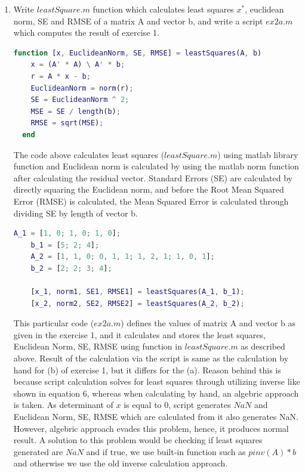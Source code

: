 \documentclass[unicode,11pt,a4paper,oneside,numbers=endperiod,openany]{scrartcl}
\begin{document}
\begin{enumerate}[label=(\alph*)]
 \item Write ${leastSquare.m}$ function which calculates least squares ${x^*}$, euclidean norm, SE and RMSE of a matrix A and vector b, and write a script ${ex2a.m}$ which computes the result of exercise 1.\\
 
  \begin{lstlisting}[language=Matlab]
  function [x, EuclideanNorm, SE, RMSE] = leastSquares(A, b)
    x = (A' * A) \ A' * b;
    r = A * x - b;
    EuclideanNorm = norm(r);
    SE = EuclideanNorm ^ 2;
    MSE = SE / length(b);
    RMSE = sqrt(MSE);
  end
 \end{lstlisting}
 
 The code above calculates least squares (${leastSquare.m}$) using matlab library function and Euclidean norm is calculated by using the matlab norm function after calculating the residual vector. Standard Errors (SE) are calculated by directly squaring the Euclidean norm, and before the Root Mean Squared Error (RMSE) is calculated, the Mean Squared Error is calculated through dividing SE by length of vector b. \\
 
 \begin{lstlisting}[language=Matlab]
    A_1 = [1, 0; 1, 0; 1, 0];
    b_1 = [5; 2; 4];
    A_2 = [1, 1, 0; 0, 1, 1; 1, 2, 1; 1, 0, 1];
    b_2 = [2; 2; 3; 4];

    [x_1, norm1, SE1, RMSE1] = leastSquares(A_1, b_1);
    [x_2, norm2, SE2, RMSE2] = leastSquares(A_2, b_2);
 \end{lstlisting}
 
 This particular code (${ex2a.m}$) defines the values of matrix A and vector b as given in the exercise 1, and it calculates and stores the least squares, Euclidean Norm, SE, RMSE using function in ${leastSquare.m}$ as described above. Result of the calculation via the script is same as the calculation by hand for (b) of exercise 1, but it differs for the (a). Reason behind this is because script calculation solves for least squares through utilizing inverse like shown in equation 6, whereas when calculating by hand, an algebric approach is taken. As determinant of ${x}$ is equal to 0, script generates ${NaN}$ and Euclidean Norm, SE, RMSE which are calculated from it also generates NaN. However, algebric approach evades this problem, hence, it produces normal result. A solution to this problem would be checking if least squares generated are ${NaN}$ and if true, we use built-in function such as ${pinv(A) * b}$ and otherwise we use the old inverse calculation approach. \\
 

\end{enumerate}
\end{document}
